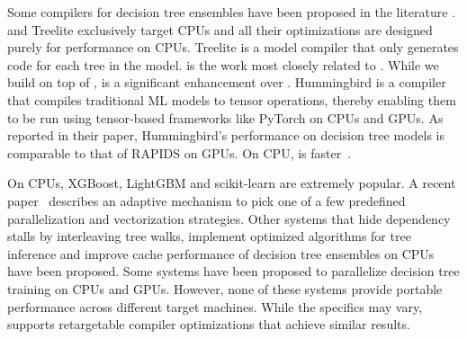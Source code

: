 Some compilers for decision tree ensembles have been proposed in the 
literature \cite{Treelite, Treebeard, Hummingbird}. \TreebeardOLD{} and Treelite
exclusively target CPUs and all their optimizations are designed purely for 
performance on CPUs. 
Treelite\cite{Treelite} is a model compiler that only  
generates  code for each tree in the model. 
\TreebeardOLD{} is the work most closely related to \Treebeard{}. While we 
build on top of \TreebeardOLD{}, \Treebeard{} is a significant enhancement 
over \TreebeardOLD{}. 
Hummingbird\cite{Hummingbird} is a compiler that compiles traditional ML models
to tensor operations, thereby enabling them to be run using tensor-based frameworks like
PyTorch\cite{NEURIPS2019_9015} on CPUs and GPUs. As reported in their paper, Hummingbird's performance
on decision tree models is comparable to that of RAPIDS on GPUs. On CPU, \TreebeardOLD{} 
is faster~\cite{Treebeard}.

On CPUs, XGBoost\cite{XGBoost}, LightGBM\cite{LightGBM} and
scikit-learn\cite{Sklearn} are extremely popular.
A recent paper~\cite{PACTVanLunteren} describes an adaptive mechanism 
to pick one of a few predefined parallelization and vectorization strategies.
Other systems that hide dependency stalls by interleaving tree walks\cite{VPred},
implement optimized algorithms for tree inference\cite{QuickScorer, QuickScorer1}
and improve cache performance of decision tree ensembles on CPUs\cite{CacheConscious1, CacheConscious2}
have been proposed.
Some systems have been proposed to parallelize decision tree training 
on CPUs and GPUs\cite{Jansson2014gpuRFAG, Nasridinov2013DecisionTC}.
However, none of these systems provide portable performance across different target machines.
While the specifics may vary, \Treebeard{} supports retargetable compiler optimizations that 
achieve similar results. %

